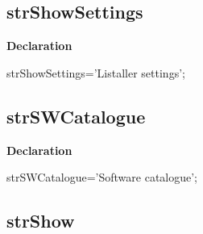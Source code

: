 \documentclass{report}
\newif\ifpdf
\begin{document}
\subsection*{strShowSettings}
\fi
\label{trstrings-strShowSettings}
\begin{list}{}{
\setlength{\itemindent}{0cm}
\setlength{\listparindent}{0cm}
\setlength{\leftmargin}{\evensidemargin}
\addtolength{\leftmargin}{\tmplength}
\settowidth{\labelsep}{X}
\addtolength{\leftmargin}{\labelsep}
\setlength{\labelwidth}{\tmplength}
}
\item[\textbf{Declaration}\hfill]
\ifpdf
\begin{flushleft}
\fi
\begin{ttfamily}
strShowSettings='Listaller settings';\end{ttfamily}

\ifpdf
\end{flushleft}
\fi

\end{list}
\ifpdf
\subsection*{\large{\textbf{strSWCatalogue}}\normalsize\hspace{1ex}\hrulefill}
\else
\subsection*{strSWCatalogue}
\fi
\label{trstrings-strSWCatalogue}
\begin{list}{}{
\setlength{\itemindent}{0cm}
\setlength{\listparindent}{0cm}
\setlength{\leftmargin}{\evensidemargin}
\addtolength{\leftmargin}{\tmplength}
\settowidth{\labelsep}{X}
\addtolength{\leftmargin}{\labelsep}
\setlength{\labelwidth}{\tmplength}
}
\item[\textbf{Declaration}\hfill]
\ifpdf
\begin{flushleft}
\fi
\begin{ttfamily}
strSWCatalogue='Software catalogue';\end{ttfamily}

\ifpdf
\end{flushleft}
\fi

\end{list}
\ifpdf
\subsection*{\large{\textbf{strShow}}\normalsize\hspace{1ex}\hrulefill}
\else
\end{document}
